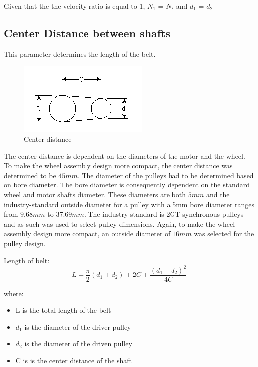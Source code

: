Given that the the velocity ratio is equal to 1, \(N_1\) = \(N_2\) and \(d_1\) = \(d_2\)

\subsection{Center Distance between shafts}
This parameter determines the length of the belt. 

\begin{figure}[H]
    \centering
    \includegraphics{Figures/NewPulley.png}
    \caption[Center distance]{Center distance\cite{noauthor_pulley_nodate}}
    \label{fig:centerdistance}
\end{figure}

The center distance is dependent on the diameters of the motor and the wheel. To make the wheel assembly design more compact, the center distance was determined to be $45mm$. The diameter of the pulleys had to be determined based on bore diameter. The bore diameter is consequently dependent on the standard wheel and motor shafts diameter. These diameters are both $5mm$ and the industry-standard outside diameter for a pulley with a 5mm bore diameter ranges from $9.68mm$ to $37.69mm$. The industry standard is 2GT synchronous pulleys and as such was used to select pulley dimensions. Again, to make the wheel assembly design more compact, an outside diameter of $16mm$ was selected for the pulley design. 
\par
Length of belt:
\begin{equation} \label{eu_eqn}
L = \frac{\pi}{2}(d_1 + d_2) + 2C + \frac{(d_1 + d_2)^2}{4C}
\end{equation}

where: 
\begin{itemize}
\item L is the total length of the belt
\item \(d_1\)  is the diameter of the driver pulley
\item \(d_2\)  is the diameter of the driven pulley
\item C is   is the center distance of the shaft
\end{itemize}

